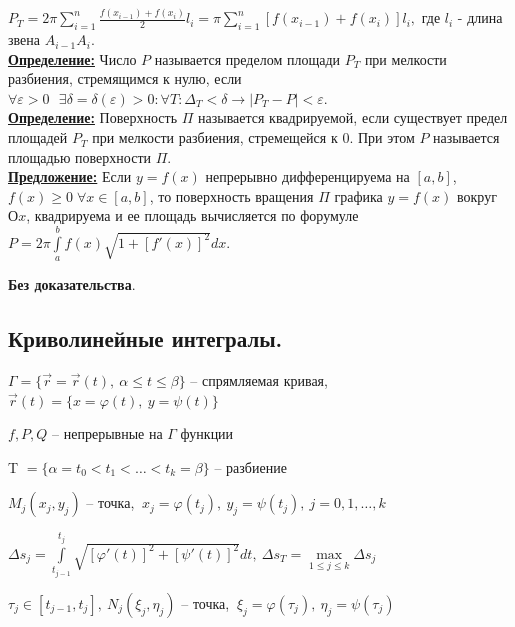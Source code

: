 \documentclass[a4paper,12pt]{article} %
\renewcommand {\geq}{\geqslant}
\begin{document}
$P_T=2\pi \sum\limits_{i=1}^n \frac{f(x_{i-1})+f(x_i)}{2}l_i=\pi \sum\limits_{i=1}^n [f(x_{i-1})+f(x_i)]l_i,$ где $l_i$ - длина звена $A_{i-1}A_i$.\\

\underline{\textbf{Определение:}} Число $P$ называется пределом площади $P_T$ при мелкости разбиения, стремящимся к нулю, если $\forall \varepsilon > 0 \text{ }\exists \delta=\delta(\varepsilon) > 0 : \forall T: \Delta_T<\delta \rightarrow |P_T-P|<\varepsilon$.\\

\underline{\textbf{Определение:}}  Поверхность $\Pi$ называется квадрируемой, если существует предел площадей $P_T$ при мелкости разбиения,  стремещейся к 0. При этом $P$ называется площадью поверхности $\Pi$.\\

\underline{\textbf{Предложение:}} Если $y=f(x)$ непрерывно дифференцируема на $[a, b]$, $f(x) \geq 0\; \forall x\in[a,b]$, то поверхность вращения $\Pi$ графика $y=f(x)$ вокруг $Оx$, квадрируема и ее площадь вычисляется по форумуле $P=2\pi \int\limits_a^b f(x) \sqrt{1+[f'(x)]^2}dx$.

\textbf{Без доказательства}.\\

\subsection{Криволинейные интегралы.}

 \hspace{2em} $\Gamma = \{ \vec{r} = \vec{r}(t), ~\alpha \leqslant t \leqslant \beta \}$ -- спрямляемая кривая, $\vec{r}(t) = \{ x = \varphi(t), ~y = \psi(t) \}$

\hspace{4em} $f, P, Q$ -- непрерывные на $\Gamma$ функции

\hspace{4em} T $= \{\alpha = t_0 < t_1 < \ldots < t_k = \beta\}$ -- разбиение

\hspace{4em} $M_j (x_j, y_j)$ -- точка, $ \ x_j = \varphi(t_j), \ y_j = \psi(t_j), ~j = 0, 1, \ldots, k$

\hspace{4em} $\Delta s_j = \int\limits_{t_{j-1}}^{t_j} \sqrt{\left[ \varphi'(t) \right]^2 + \left[ \psi'(t) \right]^2}dt, \ \Delta s_T = \max\limits_{1\leqslant j \leqslant k} \Delta s_j$

\hspace{4em} $\tau_j \in [t_{j-1}, t_j], \ N_j (\xi_j, \eta_j)$ -- точка, $ \ \xi_j = \varphi(\tau_j), \ \eta_j = \psi(\tau_j)$
\end{document}

